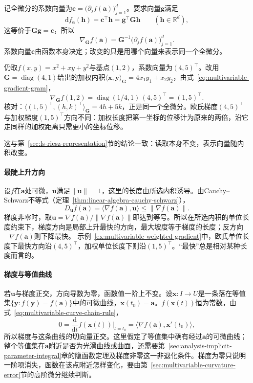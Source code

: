 记全微分的系数向量为$\bm c=\bigl(\partial_jf(\bm a)\bigr)_{j=1}^d$。要求向量$\bm g$满足
\[
 \mathrm df_{\bm a}(\bm h)=\bm c^\top\bm h=\bm g^\top\bm G\bm h\qquad(\bm h\in\mathbb R^d),
\]
这等价于$\bm G\bm g=\bm c$，所以
\begin{equation}
 \nabla_{\bm G}f(\bm a)=\bm G^{-1}\bigl(\partial_jf(\bm a)\bigr)_{j=1}^d .
\label{eq:multivariable-gradient-gram}
\end{equation}
系数向量$\bm c$由函数本身决定；改变的只是用哪个向量来表示同一个全微分。
\begin{example}[加权内积下的梯度]
\label{ex:multivariable-weighted-gradient}
仍取$f(x,y)=x^2+xy+y^2$与基点$(1,2)$，系数向量为$(4,5)^\top$。改用$\bm G=\operatorname{diag}(4,1)$给出的加权内积$\langle\bm x,\bm y\rangle_{\bm G}=4x_1y_1+x_2y_2$，由式~\eqref{eq:multivariable-gradient-gram}，
\[
 \nabla_{\bm G}f(1,2)=\operatorname{diag}(1/4,1)\,(4,5)^\top=(1,5)^\top.
\]
核对：$\langle(1,5)^\top,(h,k)^\top\rangle_{\bm G}=4h+5k$，正是同一个全微分。欧氏梯度$(4,5)^\top$与加权梯度$(1,5)^\top$方向不同：加权长度把第一坐标的位移计为原来的两倍，沿它走同样的加权距离只需更小的坐标位移。
\end{example}
这与第~\ref{sec:ls-riesz-representation}节的结论一致：读取本身不变，表示向量随内积改变。

\paragraph{最陡上升方向}
设$f$在$\bm a$处可微，$\bm u$满足$\lVert\bm u\rVert=1$，这里的长度由所选内积诱导。由Cauchy--Schwarz不等式（定理~\ref{thm:linear-algebra-cauchy-schwarz}），
\[
 D_{\bm u}f(\bm a)=\langle\nabla f(\bm a),\bm u\rangle\leq\lVert\nabla f(\bm a)\rVert.
\]
梯度非零时，取$\bm u=\nabla f(\bm a)/\lVert\nabla f(\bm a)\rVert$即达到等号。所以在所选内积的单位长度约束下，梯度方向是局部上升最快的方向，最大坡度等于梯度的长度；反方向$-\nabla f(\bm a)$则下降最快。
示例~\ref{ex:multivariable-weighted-gradient}中，欧氏单位长度下最快方向沿$(4,5)^\top$，加权单位长度下则沿$(1,5)^\top$。“最快”总是相对某种长度而言的。

\paragraph{梯度与等值曲线}
若$\bm u$与梯度正交，方向导数为零，函数值一阶上不变。设$\bm x:I\to U$是一条落在等值集$\{\bm y:f(\bm y)=f(\bm a)\}$中的可微曲线，$\bm x(t_0)=\bm a$。$f(\bm x(t))$恒为常数，由式~\eqref{eq:multivariable-curve-chain-rule}，
\[
 0=\frac{\mathrm d}{\mathrm dt}f(\bm x(t))\Big|_{t=t_0}=\langle\nabla f(\bm a),\bm x'(t_0)\rangle,
\]
所以梯度与这条曲线的切向量正交。这里假定了等值集中确有经过$\bm a$的可微曲线；整个等值集在$\bm a$附近是否为光滑曲线或曲面，还需要第~\ref{sec:analysis-implicit-parameter-integral}章的隐函数定理及梯度非零这一非退化条件。梯度为零只说明一阶项消失，函数在该点附近怎样变化，要由第~\ref{sec:multivariable-curvature-error}节的高阶微分继续判断。

